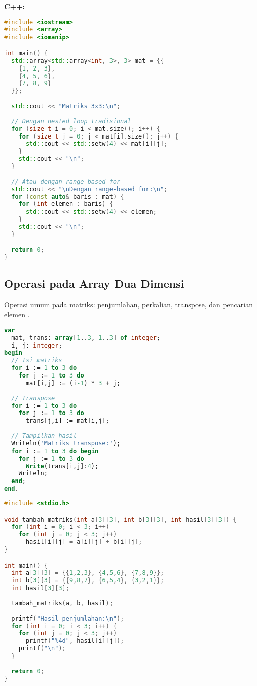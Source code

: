 \documentclass[../main.tex]{subfiles}
\begin{document}
\textbf{C++:}
\begin{lstlisting}[language=C++, caption={Menampilkan array 2D di C++}]
#include <iostream>
#include <array>
#include <iomanip>

int main() {
  std::array<std::array<int, 3>, 3> mat = {{
    {1, 2, 3},
    {4, 5, 6},
    {7, 8, 9}
  }};
  
  std::cout << "Matriks 3x3:\n";
  
  // Dengan nested loop tradisional
  for (size_t i = 0; i < mat.size(); i++) {
    for (size_t j = 0; j < mat[i].size(); j++) {
      std::cout << std::setw(4) << mat[i][j];
    }
    std::cout << "\n";
  }
  
  // Atau dengan range-based for
  std::cout << "\nDengan range-based for:\n";
  for (const auto& baris : mat) {
    for (int elemen : baris) {
      std::cout << std::setw(4) << elemen;
    }
    std::cout << "\n";
  }
  
  return 0;
}
\end{lstlisting}

\subsection{Operasi pada Array Dua Dimensi}

Operasi umum pada matriks: penjumlahan, perkalian, transpose, dan pencarian elemen \parencite{geeksforgeeks-matrix-operations}.

\begin{lstlisting}[language=Pascal, caption={Transpose matriks di Pascal}]
var
  mat, trans: array[1..3, 1..3] of integer;
  i, j: integer;
begin
  // Isi matriks
  for i := 1 to 3 do
    for j := 1 to 3 do
      mat[i,j] := (i-1) * 3 + j;
  
  // Transpose
  for i := 1 to 3 do
    for j := 1 to 3 do
      trans[j,i] := mat[i,j];
  
  // Tampilkan hasil
  Writeln('Matriks transpose:');
  for i := 1 to 3 do begin
    for j := 1 to 3 do
      Write(trans[i,j]:4);
    Writeln;
  end;
end.
\end{lstlisting}

\begin{lstlisting}[language=C, caption={Penjumlahan matriks di C}]
#include <stdio.h>

void tambah_matriks(int a[3][3], int b[3][3], int hasil[3][3]) {
  for (int i = 0; i < 3; i++)
    for (int j = 0; j < 3; j++)
      hasil[i][j] = a[i][j] + b[i][j];
}

int main() {
  int a[3][3] = {{1,2,3}, {4,5,6}, {7,8,9}};
  int b[3][3] = {{9,8,7}, {6,5,4}, {3,2,1}};
  int hasil[3][3];
  
  tambah_matriks(a, b, hasil);
  
  printf("Hasil penjumlahan:\n");
  for (int i = 0; i < 3; i++) {
    for (int j = 0; j < 3; j++)
      printf("%4d", hasil[i][j]);
    printf("\n");
  }
  
  return 0;
}
\end{lstlisting}
\end{document}
